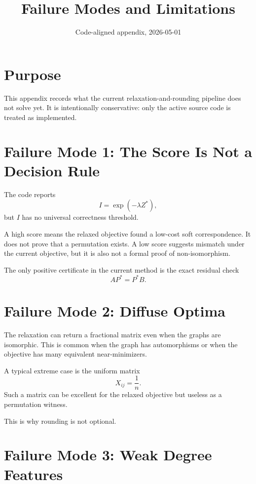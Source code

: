 \documentclass[11pt]{article}
\title{\textbf{Failure Modes and Limitations}}
\author{}
\date{Code-aligned appendix, 2026-05-01}
\begin{document}
\maketitle

\section{Purpose}

This appendix records what the current relaxation-and-rounding pipeline does
not solve yet.
It is intentionally conservative: only the active source code is treated as
implemented.

\section{Failure Mode 1: The Score Is Not a Decision Rule}

The code reports
\begin{equation}
    I=\exp(-\lambda Z^*),
\end{equation}
but $I$ has no universal correctness threshold.

A high score means the relaxed objective found a low-cost soft correspondence.
It does not prove that a permutation exists.
A low score suggests mismatch under the current objective, but it is also not
a formal proof of non-isomorphism.

The only positive certificate in the current method is the exact residual check
\begin{equation}
    AP^*=P^*B.
\end{equation}

\section{Failure Mode 2: Diffuse Optima}

The relaxation can return a fractional matrix even when the graphs are
isomorphic.
This is common when the graph has automorphisms or when the objective has many
equivalent near-minimizers.

A typical extreme case is the uniform matrix
\begin{equation}
    X_{ij}=\frac{1}{n}.
\end{equation}
Such a matrix can be excellent for the relaxed objective but useless as a
permutation witness.

This is why rounding is not optional.

\section{Failure Mode 3: Weak Degree Features}
\end{document}
